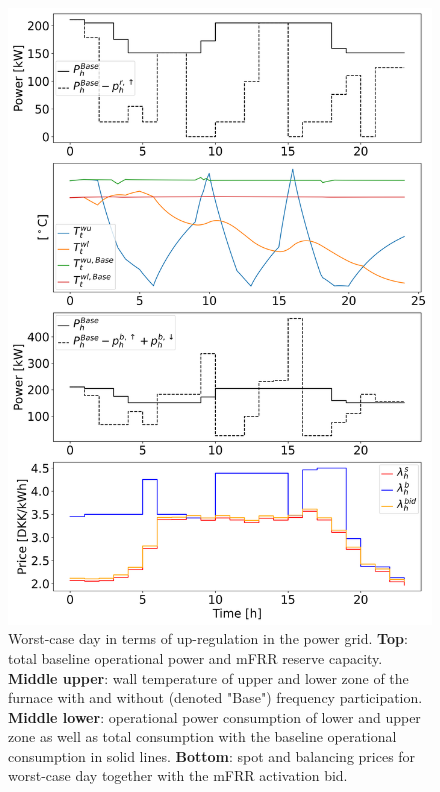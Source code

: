 \documentclass[sigconf]{acmart}
\begin{document}
\begin{figure}[t]
    \centering
    \includegraphics[width=\columnwidth]{figures/mfrr_single_case.png}
    \caption{Worst-case day in terms of up-regulation in the power grid. \textbf{Top}: total baseline operational power and mFRR reserve capacity. \textbf{Middle upper}: wall temperature of upper and lower zone of the furnace with and without (denoted "Base") frequency participation. \textbf{Middle lower}: operational power consumption of lower and upper zone as well as total consumption with the baseline operational consumption in solid lines. \textbf{Bottom}: spot and balancing prices for worst-case day together with the mFRR activation bid.}
    \label{fig:mfrr_single_case}
\end{figure}
\end{document}
